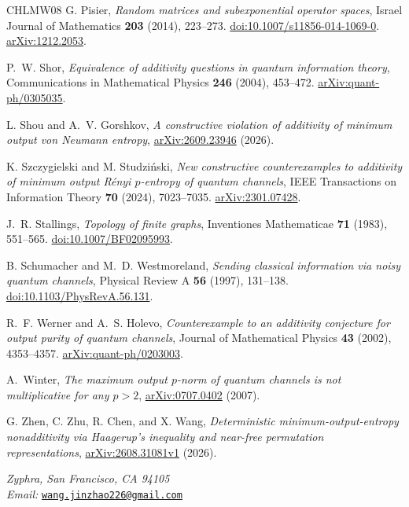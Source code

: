 \documentclass[11pt]{article}
\numberwithin{equation}{section}
\theoremstyle{boldremark}\newtheorem{remark}[theorem]{Remark}
\begin{document}
\begin{thebibliography}{CHLMW08}
G. Pisier,
\emph{Random matrices and subexponential operator spaces},
Israel Journal of Mathematics \textbf{203} (2014), 223--273.
\href{https://doi.org/10.1007/s11856-014-1069-0}{doi:10.1007/s11856-014-1069-0}.
\href{https://arxiv.org/abs/1212.2053}{arXiv:1212.2053}.

P.~W. Shor,
\emph{Equivalence of additivity questions in quantum information theory},
Communications in Mathematical Physics \textbf{246} (2004), 453--472.
\href{https://arxiv.org/abs/quant-ph/0305035}{arXiv:quant-ph/0305035}.

L. Shou and A.~V. Gorshkov,
\emph{A constructive violation of additivity of minimum output von Neumann entropy},
\href{https://arxiv.org/abs/2609.23946}{arXiv:2609.23946} (2026).

K. Szczygielski and M. Studzi\'nski,
\emph{New constructive counterexamples to additivity of minimum output R\'enyi $p$-entropy of quantum channels},
IEEE Transactions on Information Theory \textbf{70} (2024), 7023--7035.
\href{https://arxiv.org/abs/2301.07428}{arXiv:2301.07428}.

J.~R. Stallings,
\emph{Topology of finite graphs},
Inventiones Mathematicae \textbf{71} (1983), 551--565.
\href{https://doi.org/10.1007/BF02095993}{doi:10.1007/BF02095993}.

B. Schumacher and M.~D. Westmoreland,
\emph{Sending classical information via noisy quantum channels},
Physical Review A \textbf{56} (1997), 131--138.
\href{https://doi.org/10.1103/PhysRevA.56.131}{doi:10.1103/PhysRevA.56.131}.

R.~F. Werner and A.~S. Holevo,
\emph{Counterexample to an additivity conjecture for output purity of quantum channels},
Journal of Mathematical Physics \textbf{43} (2002), 4353--4357.
\href{https://arxiv.org/abs/quant-ph/0203003}{arXiv:quant-ph/0203003}.

A.~Winter,
\emph{The maximum output $p$-norm of quantum channels is not multiplicative
for any $p>2$},
\href{https://arxiv.org/abs/0707.0402}{arXiv:0707.0402} (2007).

G. Zhen, C. Zhu, R. Chen, and X. Wang,
\emph{Deterministic minimum-output-entropy nonadditivity via Haagerup's
inequality and near-free permutation representations},
\href{https://arxiv.org/abs/2608.31081v1}{arXiv:2608.31081v1} (2026).

\end{thebibliography}

\smallskip
\noindent\begin{minipage}{\textwidth}
\textit{Zyphra, San Francisco, CA 94105}\\
\textit{Email:} \href{mailto:wang.jinzhao226@gmail.com}{\texttt{wang.jinzhao226@gmail.com}}
\end{minipage}
\end{document}
